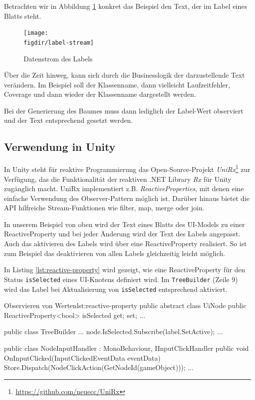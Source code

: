 Betrachten wir in Abbildung \ref{fig:label-stream} konkret das Beispiel den Text, der im Label eines Blatts steht.

\begin{figure}[htb]
  \texttt{[image: \\figdir/label-stream]}
  \caption{Datenstrom des Labels}
  \label{fig:label-stream}
\end{figure}

Über die Zeit hinweg, kann sich durch die Businesslogik der darzustellende Text verändern. Im Beispiel soll der Klassenname, dann vielleicht Laufzeitfehler, Coverage und dann wieder der Klassenname dargestellt werden.

Bei der Generierung des Baumes muss dann lediglich der Label-Wert observiert und der Text entsprechend gesetzt werden.

\subsection{Verwendung in Unity}

In Unity steht für reaktive Programmierung das Open-Source-Projekt \textit{UniRx}\footnote{\url{https://github.com/neuecc/UniRx}} zur Verfügung, das die Funktionalität der reaktiven .NET Library \textit{Rx} für Unity zugänglich macht. UniRx implementiert z.B. \textit{ReactiveProperties}, mit denen eine einfache Verwendung des Observer-Pattern möglich ist. Darüber hinaus bietet die API hilfreiche Stream-Funktionen wie filter, map, merge oder join.

In unserem Beispiel von oben wird der Text eines Blatts des UI-Models zu einer ReactiveProperty und bei jeder Änderung wird der Text des Labels angepasst. Auch das aktivieren des Labels wird über eine ReactiveProperty realisiert. So ist zum Beispiel das deaktivieren von allen Labels gleichzeitig leicht möglich.

In Listing \ref{lst:reactive-property} wird gezeigt, wie eine ReactiveProperty für den Status \texttt{isSelected} eines UI-Knotens definiert wird. Im \texttt{TreeBuilder} (Zeile 9) wird das Label bei Aktualisierung von \texttt{isSelected} entsprechend aktiviert.

\begin{codesnippet}{Observieren von Werten}{lst:reactive-property}
public abstract class UiNode
{
    public ReactiveProperty<bool> isSelected { get; set; }
    ...
}

public class TreeBuilder {
    ...
    node.IsSelected.Subscribe(label.SetActive);
    ...
}

public class NodeInputHandler : MonoBehaviour, IInputClickHandler
{
    public void OnInputClicked(InputClickedEventData eventData)
    {
        Store.Dispatch(NodeClickAction(GetNodeId(gameObject)));
    }
    ...
}
\end{codesnippet}


